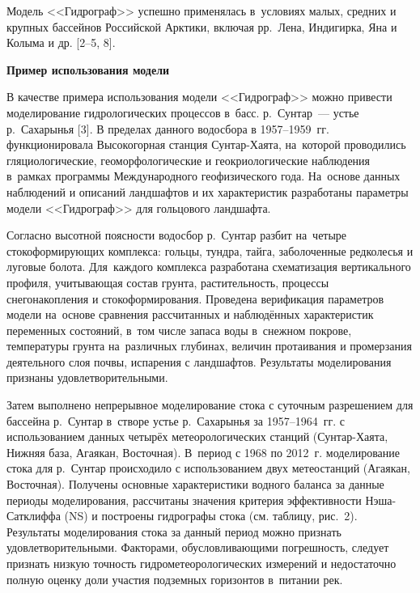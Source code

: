 Модель <<Гидрограф>> успешно применялась в~условиях малых, средних и крупных бассейнов Российской Арктики, включая рр.~Лена, Индигирка, Яна и Колыма и др. [2--5, 8].\enlargethispage{\baselineskip}

\textbf{Пример использования модели}

В качестве примера использования модели <<Гидрограф>> можно привести моделирование гидрологических процессов в~басс.  р.~Сунтар~--- устье р.~Сахарынья [3]. В пределах данного водосбора в 1957--1959~гг. функционировала Высокогорная станция Сунтар-Хаята, на~которой проводились гляциологические, геоморфологические и геокриологические наблюдения в~рамках программы Международного геофизического года. На~основе данных наблюдений и описаний ландшафтов и их характеристик разработаны параметры модели <<Гидрограф>> для гольцового ландшафта.

Согласно высотной поясности водосбор р.~Сунтар разбит на~четыре стокоформирующих комплекса: гольцы, тундра, тайга, заболоченные редколесья и луговые болота. Для~каждого комплекса разработана схематизация вертикального профиля, учитывающая состав грунта, растительность, процессы снегонакопления и стокоформирования. Проведена верификация параметров модели на~основе сравнения рассчитанных и наблюдённых характеристик переменных состояний, в~том числе запаса воды в~снежном покрове, температуры грунта на~различных глубинах, величин протаивания и промерзания деятельного слоя почвы, испарения с ландшафтов. Результаты моделирования признаны удовлетворительными.

Затем выполнено непрерывное моделирование стока с суточным разрешением для бассейна р.~Сунтар в~створе устье р.~Сахарынья за 1957--1964~гг. с использованием данных четырёх метеорологических станций (Сунтар-Хаята, Нижняя база, Агаякан, Восточная). В~период с 1968 по 2012~г. моделирование стока для р.~Сунтар происходило с использованием двух метеостанций (Агаякан, Восточная). Получены основные характеристики водного баланса за данные периоды моделирования, рассчитаны значения критерия эффективности Нэша-Сатклиффа (NS) и построены гидрографы стока (см. таблицу, рис.~2). Результаты моделирования стока за данный период можно признать удовлетворительными. Факторами, обусловливающими погрешность, следует признать низкую точность гидрометеорологических измерений и недостаточно полную оценку доли участия подземных горизонтов в~питании рек.\enlargethispage{\baselineskip}





